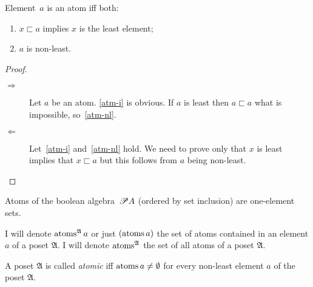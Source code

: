 \begin{prop}
Element~$a$ is an atom iff both:
\begin{enumerate}
\item\label{atm-i} $x\sqsubset a$ implies $x$ is the least element;
\item\label{atm-nl} $a$ is non-least.
\end{enumerate}
\end{prop}

\begin{proof}
~
\begin{description}
\item[$\Rightarrow$] Let $a$ be an atom.
\ref{atm-i} is obvious. If $a$ is least then $a\sqsubset a$ what is impossible, so~\ref{atm-nl}.
\item[$\Leftarrow$] Let~\ref{atm-i} and~\ref{atm-nl} hold.
We need to prove only that $x$ is least implies that $x\sqsubset a$ but this follows from $a$ being non-least.
\end{description}

\end{proof}

\begin{example}
Atoms of the boolean algebra~$\mathscr{P} A$ (ordered by set inclusion) are one-element sets.
\end{example}

I will denote $\operatorname{atoms}^{\mathfrak{A}}a$ or just $(\operatorname{atoms} a)$ the
set of atoms contained in an element $a$ of a poset $\mathfrak{A}$.
I will denote $\operatorname{atoms}^{\mathfrak{A}}$ the set of all atoms of a poset
$\mathfrak{A}$.
\begin{defn}
A poset $\mathfrak{A}$ is called \emph{atomic} iff
$\operatorname{atoms} a\neq\emptyset$ for every non-least element $a$ of the poset
$\mathfrak{A}$.
\end{defn}

